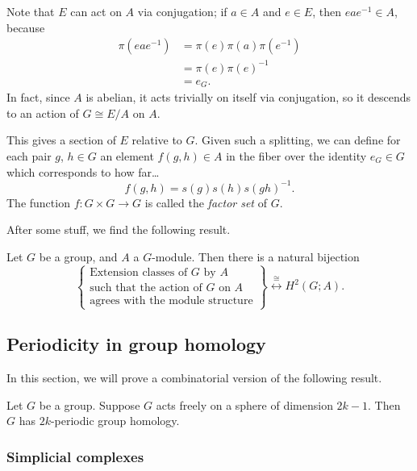 \documentclass[main.tex]{subfiles}
\begin{document}
Note that $E$ can act on $A$ via conjugation; if $a \in A$ and $e \in E$, then $eae^{-1} \in A$, because
\begin{align*}
  \pi(eae^{-1}) &=\pi(e)\pi(a)\pi(e^{-1}) \\
  &= \pi(e)\pi(e)^{-1} \\
  &= e_{G}.
\end{align*}
In fact, since $A$ is abelian, it acts trivially on itself via conjugation, so it descends to an action of $G \cong E/A$ on $A$.

This gives a section of $E$ relative to $G$. Given such a splitting, we can define for each pair $g$, $h \in G$ an element $f(g, h) \in A$ in the fiber over the identity $e_{G} \in G$ which corresponds to how far\dots
\begin{equation*}
  f(g, h) = s(g)s(h)s(gh)^{-1}.
\end{equation*}
The function $f\colon G \times G \to G$ is called the \emph{factor set} of $G$.

After some stuff, we find the following result.

\begin{theorem}
  Let $G$ be a group, and $A$ a $G$-module. Then there is a natural bijection
  \begin{equation*}
    \left\{ 
      \substack{\text{Extension classes of $G$ by $A$} \\ \text{such that the action of $G$ on $A$} \\ \text{agrees with the module structure}}
    \right\}
    \overset{\cong}{\longleftrightarrow}
    H^{2}(G; A).
  \end{equation*}
\end{theorem}

\subsection{Periodicity in group homology}
\label{ssc:periodicity_in_group_homology}

In this section, we will prove a combinatorial version of the following result.

\begin{fact}
  \label{fact:periodicity_in_group_homology}
  Let $G$ be a group. Suppose $G$ acts freely on a sphere of dimension $2k-1$. Then $G$ has $2k$-periodic group homology.
\end{fact}

\subsubsection{Simplicial complexes}
\label{sss:simplicial_complexes}
\end{document}
